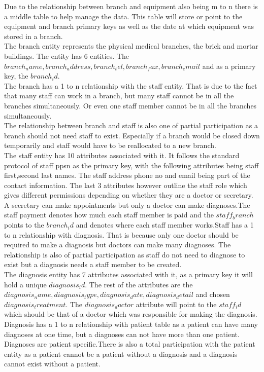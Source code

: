 \documentclass{article}
\begin{document}
Due to the relationship between branch and equipment also being m to n there is a middle table to help manage the data. This table will store or point to the equipment and branch primary keys as well as the date at which equipment was stored in a branch.\\



The branch entity represents the physical medical branches, the brick and mortar buildings. The entity has 6 entities. The $branch_name, branch_address, branch_tel, branch_fax, branch_email$ and as a primary key, the $branch_id$.\\

The branch has a 1 to n relationship with the staff entity. That is due to the fact that many staff can work in a branch, but many staff cannot be in all the branches simultaneously. Or even one staff member cannot be in all the branches simultaneously.\\
The relationship between branch and staff is also one of partial participation as a branch should not need staff to exist. Especially if a branch would be closed down temporarily and staff would have to be reallocated to a new branch. \\

The staff entity has 10 attributes associated with it. It follows the standard protocol of staff ppsn as the primary key, with the following attributes being staff first,second last names. The staff address phone no and email being part of the contact information. The last 3 attributes however outline the staff role which gives different permissions depending on whether they are a doctor or secretary. A secretary can make appointments but only a doctor can make diagnoses.The staff payment denotes how much each staff member is paid and the $staff_branch$ points to the $branch_id$ and denotes where each staff member works.Staff has a 1 to n relationship with diagnosis. That is because only one doctor should be required to make a diagnosis but doctors can make many diagnoses. The relationship is also of partial participation as staff do not need to diagnose to exist but a diagnosis needs a staff member to be created.\\

The diagnosis entity has 7 attributes associated with it, as a primary key it will hold a unique $diagnosis_id$. The rest of the attributes are the $diagnosis_name, diagnosis_type, diagnosis_date, diagnosis_detail$ and chosen $diagnosis_treatment$. The $diagnosis_doctor$ attribute will point to the $staff_id$ which should be that of a doctor which was responsible for making the diagnosis.
Diagnosis has a 1 to n relationship with patient table as a patient can have many diagnoses at one time, but a diagnoses can not have more than one patient. Diagnoses are patient specific.There is also a total participation with the patient entity as a patient cannot be a patient without a diagnosis and a diagnosis cannot exist without a patient.\\
\end{document}
